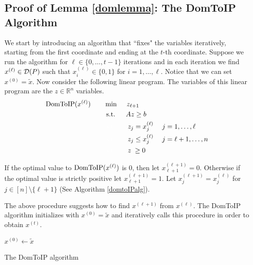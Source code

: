 \subsection{Proof of Lemma \ref{domlemma}: The DomToIP Algorithm}

We start by introducing an algorithm that ``fixes" the variables iteratively, starting from the first coordinate and ending at the $t$-th coordinate. Suppose we run the algorithm for $\ell\in \{0,\ldots,t-1\}$ iterations and in each iteration we find $x^{(\ell)}\in \operatorname{\mathcal{D}}(P)$  such that $x^{(\ell)}_i\in \{0,1\}$ for $i=1,\ldots,\ell$. Notice that we can set $x^{(0)}=\tilde{x}$. Now consider the following linear program. The variables of this linear program are the $z\in \mathbb{R}^n$ variables.
\begin{align}
\DOMtoS(x^{(\ell)})\quad\quad& \min\quad \;z_{\ell+1}\\
&\;\text{s.t.} \quad \;\;Az\geq b \\
&\;{\color{white}{\text{s.t.}} }\quad \;\; \; z_j = x^{(\ell)}_j \quad \; j =1,\ldots, \ell\\
&\;{\color{white}{\text{s.t.}} }\quad \; \;\; z_j \leq x^{(\ell)}_j \quad \; j = \ell+1,\ldots,n\\
&\;{\color{white}{\text{s.t.}} }\quad \; \;\; z\;\geq 0
\end{align}

If the optimal value to $\operatorname{{{DomToIP}}}(x^{(\ell)})$ is 0, then let $x^{(\ell+1)}_{\ell+1} = 0$. Otherwise if the optimal value is strictly positive let $x^{(\ell+1)}_{\ell+1} = 1$. Let $x^{(\ell+1)}_j = x^{(\ell)}_j$ for $j\in [n]\setminus \{\ell+1\}$ (See Algorithm \ref{domtoIPalg}).

The above procedure suggests how to find $x^{(\ell+1)}$ from $x^{(\ell)}$. The DomToIP algorithm initializes with $x^{(0)}=\tilde{x}$ and  iteratively calls this procedure in order to obtain $x^{(t)}$. 

\vspace*{10pt}
\begin{algorithm}[h]
	$x^{(0)}\leftarrow \tilde{x}$\\
	\caption{The DomToIP algorithm}
	\label{domtoIPalg}
\end{algorithm}
\vspace*{10pt}

